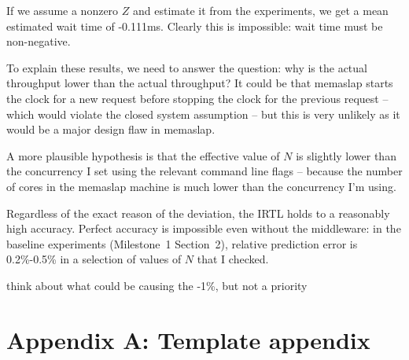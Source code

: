 \documentclass[11pt]{article}
\newcommand{\todo}[1]{\fcolorbox{black}{Apricot}{TODO: #1}}
\begin{document}
If we assume a nonzero $Z$ and estimate it from the experiments, we get a mean estimated wait time of -0.111ms. Clearly this is impossible: wait time must be non-negative.

To explain these results, we need to answer the question: why is the actual throughput lower than the actual throughput? It could be that memaslap starts the clock for a new request before stopping the clock for the previous request -- which would violate the closed system assumption -- but this is very unlikely as it would be a major design flaw in memaslap.

A more plausible hypothesis is that the effective value of $N$ is slightly lower than the concurrency I set using the relevant command line flags -- because the number of cores in the memaslap machine is much lower than the concurrency I'm using.

Regardless of the exact reason of the deviation, the IRTL holds to a reasonably high accuracy. Perfect accuracy is impossible even without the middleware: in the baseline experiments (Milestone~1 Section~2), relative prediction error is 0.2\%-0.5\% in a selection of values of $N$ that I checked.

\todo{if time} think about what could be causing the -1\%, but not a priority






\clearpage

\section*{Appendix A: Template appendix}
\label{sec:appa}
\end{document}
